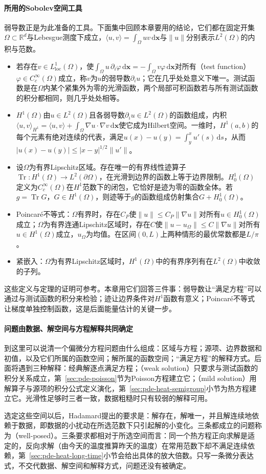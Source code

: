 \paragraph{所用的Sobolev空间工具}
弱导数正是为此准备的工具。下面集中回顾本章要用的结论，它们都在固定开集$\Omega\subset\mathbb R^d$与Lebesgue测度下成立，$\langle u,v\rangle=\int_\Omega uv\,\mathrm d\bm x$与$\|u\|$分别表示$L^2(\Omega)$的内积与范数。
\begin{itemize}
  \item 若存在$v\in L^1_{\mathrm{loc}}(\Omega)$，使$\int_\Omega u\,\partial_i\varphi\,\mathrm d\bm x=-\int_\Omega v\varphi\,\mathrm d\bm x$对所有（test function）$\varphi\in C_c^\infty(\Omega)$成立，称$v$为$u$的弱导数$\partial_iu$；它在几乎处处意义下唯一。测试函数是在$\Omega$内某个紧集外为零的光滑函数，两个局部可积函数若与所有测试函数的积分都相同，则几乎处处相等。
  \item $H^1(\Omega)$由$u\in L^2(\Omega)$且各弱导数$\partial_iu\in L^2(\Omega)$的函数组成，内积$\langle u,v\rangle_{H^1}=\langle u,v\rangle+\int_\Omega\nabla u\cdot\nabla v\,\mathrm d\bm x$使它成为Hilbert空间。一维时，$H^1(a,b)$的每个元素有绝对连续的代表，满足$u(x)-u(y)=\int_y^xu'(s)\,\mathrm ds$，从而$|u(x)-u(y)|\leq|x-y|^{1/2}\|u'\|$。
  \item 设$\Omega$为有界Lipschitz区域。存在唯一的有界线性迹算子$\operatorname{Tr}:H^1(\Omega)\to L^2(\partial\Omega)$，在光滑到边界的函数上等于边界限制。$H_0^1(\Omega)$定义为$C_c^\infty(\Omega)$在$H^1$范数下的闭包，它恰好是迹为零的函数全体。若$g=\operatorname{Tr}G$，$G\in H^1(\Omega)$，则迹等于$g$的函数组成仿射集合$G+H_0^1(\Omega)$。
  \item Poincaré不等式：$\Omega$有界时，存在$C_P$使$\|u\|\leq C_P\|\nabla u\|$对所有$u\in H_0^1(\Omega)$成立；$\Omega$为有界连通Lipschitz区域时，存在$C$使$\|u-u_\Omega\|\leq C\|\nabla u\|$对所有$u\in H^1(\Omega)$成立，$u_\Omega$为均值。在区间$(0,L)$上两种情形的最优常数都是$L/\pi$。
  \item 紧嵌入：$\Omega$为有界Lipschitz区域时，$H^1(\Omega)$中的有界序列有在$L^2(\Omega)$中收敛的子列。
\end{itemize}
这些定义与定理的证明可参考。本章用它们回答三件事：弱导数让“满足方程”可以通过与测试函数的积分来检验；迹让边界条件对$H^1$函数有意义；Poincaré不等式让梯度单独控制函数，这是后面能量估计的关键一步。

\paragraph{问题由数据、解空间与方程解释共同确定}
到这里可以说清一个偏微分方程问题由什么组成：区域与方程；源项、边界数据和初值，以及它们所属的函数空间；解所属的函数空间；“满足方程”的解释方式。后面将遇到三种解释：经典解逐点满足方程；（weak solution）只要求与测试函数的积分关系成立，第~\ref{sec:pde-poisson}节为Poisson方程建立它；（mild solution）用解算子与源项的积分公式定义演化，第~\ref{sec:pde-heat-semigroup}小节为热方程建立它。光滑性足够时三者一致，数据粗糙时只有较弱的解释可用。

选定这些空间以后，Hadamard提出的要求是：解存在，解唯一，并且解连续地依赖于数据，即数据的小扰动在所选范数下只引起解的小变化。三条都成立的问题称为（well-posed）。三条要求都相对于所选空间而言：同一个热方程正向求解是适定的，反向求解（由今天的温度推算昨天的温度）在常用范数下却不满足连续依赖，第~\ref{sec:pde-heat-long-time}小节会给出具体的放大倍数。只写一条微分表达式，不交代数据、解空间和解释方式，问题还没有被确定。
